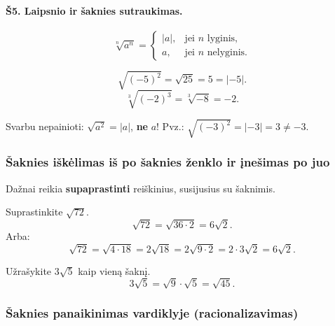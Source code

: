 \paragraph{Š5. Laipsnio ir šaknies sutraukimas.}
\[
    \sqrt[n]{a^n} =
    \begin{cases}
        |a|, & \text{jei } n \text{ lyginis}, \\
        a,   & \text{jei } n \text{ nelyginis}.
    \end{cases}
\]

\begin{example}
\[
    \sqrt{(-5)^2} = \sqrt{25} = 5 = |-5|.
\]
\[
    \sqrt[3]{(-2)^3} = \sqrt[3]{-8} = -2.
\]
\end{example}

\begin{remark}
Svarbu nepainioti: $\sqrt{a^2} = |a|$, \textbf{ne} $a$!
Pvz.: $\sqrt{(-3)^2} = |-3| = 3 \neq -3$.
\end{remark}

\subsubsection*{Šaknies iškėlimas iš po šaknies ženklo ir
                įnešimas po juo}

Dažnai reikia \textbf{supaprastinti} reiškinius, susijusius su šaknimis.

\begin{example}
Suprastinkite $\sqrt{72}$.
\[
    \sqrt{72} = \sqrt{36 \cdot 2} = 6\sqrt{2}.
\]
Arba:
\[
    \sqrt{72} = \sqrt{4 \cdot 18} = 2\sqrt{18} = 2\sqrt{9 \cdot 2}
    = 2 \cdot 3\sqrt{2} = 6\sqrt{2}.
\]
\end{example}

\begin{example}
Užrašykite $3\sqrt{5}$ kaip vieną šaknį.
\[
    3\sqrt{5} = \sqrt{9} \cdot \sqrt{5} = \sqrt{45}.
\]
\end{example}

\subsubsection*{Šaknies panaikinimas vardiklyje (racionalizavimas)}

